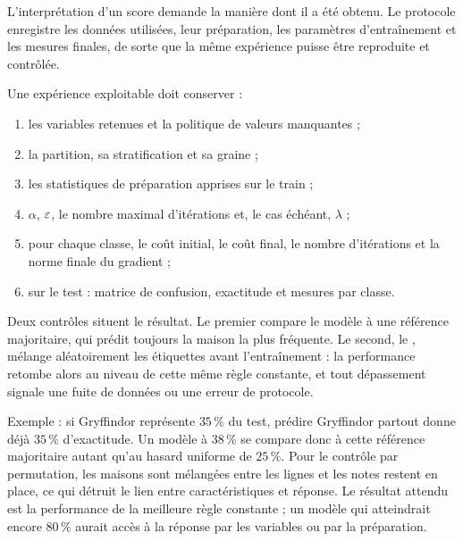 \begin{lecture}
L'interprétation d'un score demande la manière dont il a été obtenu. Le protocole
enregistre les données utilisées, leur préparation, les paramètres d'entraînement
et les mesures finales, de sorte que la même expérience puisse être reproduite et
contrôlée.
\end{lecture}

Une expérience exploitable doit conserver :
\begin{enumerate}
  \item les variables retenues et la politique de valeurs manquantes ;
  \item la partition, sa stratification et sa graine ;
  \item les statistiques de préparation apprises sur le train ;
  \item $\alpha$, $\varepsilon$, le nombre maximal d'itérations et, le cas échéant,
        $\lambda$ ;
  \item pour chaque classe, le coût initial, le coût final, le nombre
        d'itérations et la norme finale du gradient ;
  \item sur le test : matrice de confusion, exactitude et mesures par classe.
\end{enumerate}

Deux contrôles situent le résultat. Le premier compare le modèle à une référence
majoritaire, qui prédit toujours la maison la plus fréquente. Le second, le , mélange
aléatoirement les étiquettes avant l'entraînement : la performance retombe alors
au niveau de cette même règle constante, et tout dépassement signale une fuite de
données ou une erreur de protocole.

Exemple : si Gryffindor représente $35\,\%$ du test, prédire Gryffindor partout
donne déjà $35\,\%$ d'exactitude. Un modèle à $38\,\%$ se compare donc à cette
référence majoritaire autant qu'au hasard uniforme de $25\,\%$. Pour le contrôle
par permutation, les maisons sont mélangées entre les lignes et les notes restent
en place, ce qui détruit le lien entre caractéristiques et réponse. Le résultat
attendu est la performance de la meilleure règle constante ; un modèle qui
atteindrait encore $80\,\%$ aurait accès à la réponse par les variables ou par la
préparation.

